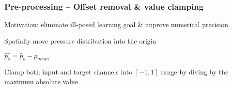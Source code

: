 \begin{frame}
    \frametitle{Pre-processing -- Offset removal \& value clamping}
\vspace*{0.8cm}
Motivation: eliminate ill-posed learning goal \& improve numerical precision

Spatially move pressure distribution into the origin

$\hat{p_o} = \tilde{p_o} - p_{mean}$    

Clamp both input and target channels into $[-1, 1]$ range by diving by the maximum absolute value

\end{frame}
\clearpage

